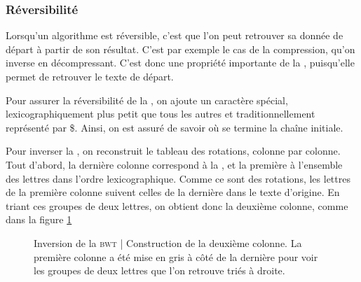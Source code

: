 \subsubsection{Réversibilité}
Lorsqu'un algorithme est réversible, c'est que l'on peut retrouver sa donnée de départ à partir de son résultat. C'est par exemple le cas de la compression, qu'on inverse en décompressant. C'est donc une propriété importante de la \bwt, puisqu'elle permet de retrouver le texte de départ.

Pour assurer la réversibilité de la \bwt, on ajoute un caractère spécial, lexicographiquement plus petit que tous les autres et traditionnellement représenté par \$. Ainsi, on est assuré de savoir où se termine la chaîne initiale.

Pour inverser la \bwt, on reconstruit le tableau des rotations, colonne par colonne.
Tout d'abord, la dernière colonne correspond à la \bwt, et la première à l'ensemble des lettres dans l'ordre lexicographique. Comme ce sont des rotations, les lettres de la première colonne suivent celles de la dernière dans le texte d'origine. En triant ces groupes de deux lettres, on obtient donc la deuxième colonne, comme dans la figure \ref{unbwt}

\begin{figure}[h!]
\caption{Inversion de la \textsc{bwt} | Construction de la deuxième colonne. La première colonne a été mise en gris à côté de la dernière pour voir les groupes de deux lettres que l'on retrouve triés à droite.}
\label{unbwt} 
\end{figure}

